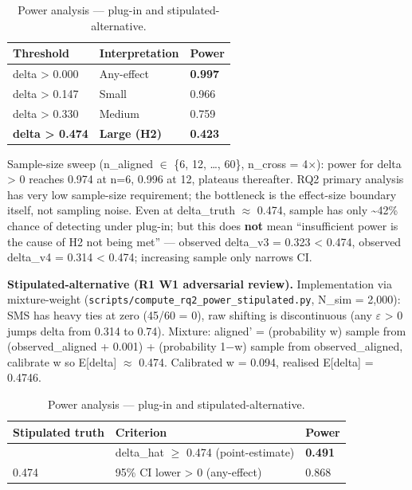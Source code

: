\documentclass[review,12pt,authoryear]{elsarticle}
\begin{document}
{\def\LTcaptype{table} %
\begin{longtable}[]{@{}lll@{}}
\caption{Power analysis --- plug-in and stipulated-alternative.}\label{tab:p2-23}\\
\toprule\noalign{}
Threshold & Interpretation & Power \\
\midrule\noalign{}
\endhead
\bottomrule\noalign{}
\endlastfoot
delta \textgreater{} 0.000 & Any-effect & \textbf{0.997} \\
delta \textgreater{} 0.147 & Small & 0.966 \\
delta \textgreater{} 0.330 & Medium & 0.759 \\
\textbf{delta \textgreater{} 0.474} & \textbf{Large (H2)} &
\textbf{0.423} \\
\end{longtable}
}

Sample-size sweep (n\_aligned $\in$ \{6, 12, \ldots, 60\}, n\_cross = 4$\times$):
power for delta \textgreater{} 0 reaches 0.974 at n=6, 0.996 at 12,
plateaus thereafter. RQ2 primary analysis has very low sample-size
requirement; the bottleneck is the effect-size boundary itself, not
sampling noise. Even at delta\_truth $\approx$ 0.474, sample has only
\textasciitilde42\% chance of detecting under plug-in; but this does
\textbf{not} mean ``insufficient power is the cause of H2 not being
met'' --- observed delta\_v3 = 0.323 \textless{} 0.474, observed
delta\_v4 = 0.314 \textless{} 0.474; increasing sample only narrows CI.

\textbf{Stipulated-alternative (R1 W1 adversarial review).} Implementation via
mixture-weight (\texttt{scripts/compute\_rq2\_power\_stipulated.py},
N\_sim = 2,000): SMS has heavy ties at zero (45/60 = 0), raw shifting is
discontinuous (any $\varepsilon$ \textgreater{} 0 jumps delta from 0.314 to 0.74).
Mixture: aligned' = (probability w) sample from (observed\_aligned +
0.001) + (probability 1−w) sample from observed\_aligned, calibrate w so
E{[}delta{]} $\approx$ 0.474. Calibrated w = 0.094, realised E{[}delta{]} =
0.4746.

{\def\LTcaptype{table} %
\begin{longtable}[]{@{}lll@{}}
\caption{Power analysis --- plug-in and stipulated-alternative.}\label{tab:p2-24}\\
\toprule\noalign{}
Stipulated truth & Criterion & Power \\
\midrule\noalign{}
\endhead
\bottomrule\noalign{}
\endlastfoot
0.474 & delta\_hat $\geq$ 0.474 (point-estimate) & \textbf{0.491} \\
0.474 & 95\% CI lower \textgreater{} 0 (any-effect) & 0.868 \\
\end{longtable}
}
\end{document}
